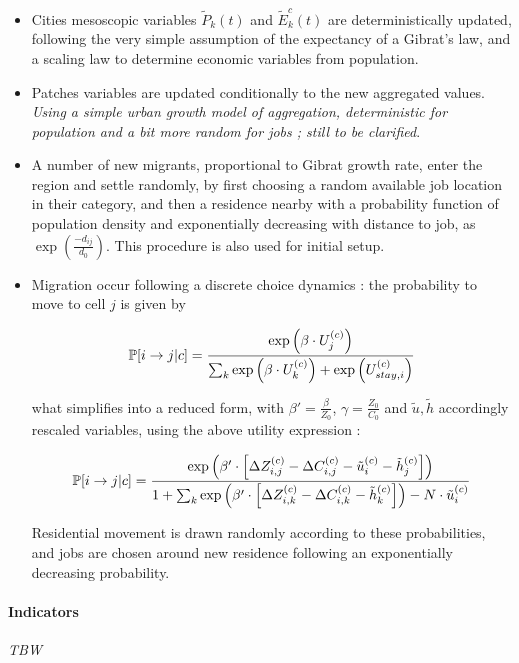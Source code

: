 \begin{itemize}
\item Cities mesoscopic variables $\tilde{P}_k(t)$ and $\tilde{E}_k^{c}(t)$ are deterministically updated, following the very simple assumption of the expectancy of a Gibrat's law, and a scaling law to determine economic variables from population.
\item Patches variables are updated conditionally to the new aggregated values. \textit{Using a simple urban growth model of aggregation, deterministic for population and a bit more random for jobs ; still to be clarified}.
\item A number of new migrants, proportional to Gibrat growth rate, enter the region and settle randomly, by first choosing a random available job location in their category, and then a residence nearby with a probability function of population density and exponentially decreasing with distance to job, as $\exp{\left(\frac{-d_{ij}}{d_0}\right)}$. This procedure is also used for initial setup.
\item Migration occur following a discrete choice dynamics : the probability to move to cell $j$ is given by

\[
\operatorname{\mathbb{P}}\!\left[i\rightarrow j | c\right] = \frac{\exp{\left(\beta\cdot U_j^{(c)}\right)}}{\sum_k \exp{\left(\beta\cdot U_k^{(c)}\right)}+\exp{\left(U_{stay,i}^{(c)}\right)}}
\]

what simplifies into a reduced form, with $\beta' = \frac{\beta}{Z_0}$, $\gamma = \frac{Z_0}{C_0}$ and $\tilde{u},\tilde{h}$ accordingly rescaled variables, using the above utility expression :

\[
\operatorname{\mathbb{P}}\!\left[i\rightarrow j | c\right] = \frac{\exp{\left(\beta'\cdot \left[\Delta Z_{i,j}^{(c)} - \Delta C_{i,j}^{(c)} - \tilde{u}_i^{(c)} - \tilde{h}_j^{(c)} \right] \right)}}{1 + \sum_k {\exp{\left(\beta'\cdot \left[\Delta Z_{i,k}^{(c)} - \Delta C_{i,k}^{(c)} - \tilde{h}_k^{(c)} \right] \right)} - N\cdot \tilde{u}_i^{(c)}}}
\]

Residential movement is drawn randomly according to these probabilities, and jobs are chosen around new residence following an exponentially decreasing probability.

\end{itemize}


\paragraph{Indicators}

\textit{TBW}

